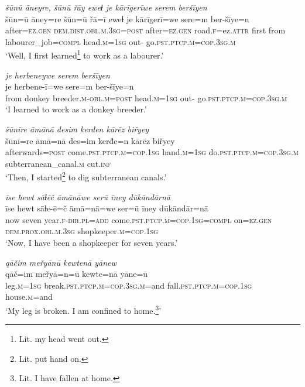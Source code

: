 \ea \label{ŽM.4}
\textit{šūnū āneyre, šūnū řāy eweɫ je kārīgerīwe serem beršīyen} \\ 
\gll šūn=ū āney=re šūn=ū řā=ī eweɫ je kārīgerī=we sere=m ber-šīye=n \\ 
 after\textsc{=ez.gen} \textsc{dem.dist}\textsc{.obl}\textsc{.m}\textsc{.3sg}\textsc{=\textsc{post}} after\textsc{=ez.gen} road\textsc{.f}=ez.\textsc{attr} first from labourer\_job\textsc{=compl} head\textsc{.m}\textsc{=\textsc{1sg}} out- go\textsc{.pst}\textsc{.ptcp}\textsc{.m}\textsc{=cop}\textsc{.3sg}\textsc{.m} \\ 
\glt `Well, I first learned\footnote{Lit. my head went out.}  to work as a labourer.'
\z 
 
\ea \label{ŽM.5}
\textit{je herbeneywe serem beršīyen} \\ 
\gll je herbene-ī=we sere=m ber-šīye=n \\ 
 from donkey breeder\textsc{.m}\textsc{-obl}\textsc{.m}\textsc{=\textsc{post}} head\textsc{.m}\textsc{=\textsc{1sg}} out- go\textsc{.pst}\textsc{.ptcp}\textsc{.m}\textsc{=cop}\textsc{.3sg}\textsc{.m} \\ 
\glt `I learned to work as a donkey breeder.'
\z 
 
\ea \label{ŽM.6}
\textit{šūnīre āmānā desim kerđen kārēz biřyey} \\ 
\gll šūnī=re āmā=nā des=im kerđe=n kārēz biřyey \\ 
 afterwards\textsc{=\textsc{post}} come\textsc{.pst}\textsc{.ptcp}\textsc{.m}\textsc{=cop}\textsc{.\textsc{1sg}} hand\textsc{.m}\textsc{=\textsc{1sg}} do\textsc{.pst}\textsc{.ptcp}\textsc{.m}\textsc{=cop}\textsc{.3sg}\textsc{.m} subterranean\_canal\textsc{.m} cut\textsc{.inf} \\ 
\glt `Then, I started\footnote{Lit. put hand on.} to dig subterranean canals.'
\z 
 
\ea \label{ŽM.8}
\textit{īse ħewt sāɫēč āmānāwe serū īney dūkāndārnā} \\ 
\gll īse ħewt sāɫe-ē=č āmā=nā=we ser=ū īney dūkāndār=nā \\ 
 now seven year\textsc{.f}\textsc{-dir}\textsc{.pl}\textsc{=add} come\textsc{.pst}\textsc{.ptcp}\textsc{.m}\textsc{=cop}\textsc{.\textsc{1sg}}\textsc{=compl} on\textsc{=ez.gen} \textsc{dem.prox}\textsc{.obl}\textsc{.m}\textsc{.3sg} shopkeeper\textsc{.m}\textsc{=cop}\textsc{.\textsc{1sg}} \\ 
\glt `Now, I have been a shopkeeper for seven years.'
\z 
 
\ea \label{ŽM.9}
\textit{qāčim meřyānū kewtenā yānew} \\ 
\gll qāč=im meřyā=n=ū kewte=nā yāne=ū \\ 
 leg\textsc{.m}\textsc{=\textsc{1sg}} break\textsc{.pst}\textsc{.ptcp}\textsc{.m}\textsc{=cop}\textsc{.3sg}\textsc{.m}=and fall\textsc{.pst}\textsc{.ptcp}\textsc{.m}\textsc{=cop}\textsc{.\textsc{1sg}} house\textsc{.m}=and \\ 
\glt `My leg is broken. I am confined to home.\footnote{Lit. I have fallen at home.}'
\z 
 
